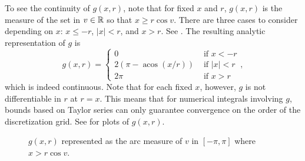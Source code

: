 \documentclass{amsart}
\DeclareMathOperator*{\acos}{acos}
\theoremstyle{plain}
\begin{document}
To see the continuity of $g(x,r)$, note that for fixed $x$ and $r$, $g(x,r)$ is the measure of the set in $v\in \mathbb R$ so that $x \ge r \cos v$.  
There are three cases to consider depending on $x$: $x \le -r$, $|x| < r$, and $x > r$. 
See .
The resulting analytic representation of $g$ is
\begin{equation}
  g(x,r) = \begin{cases}
    0 &\text{ if } x < -r\\
    2(\pi - \acos(x/r)) &\text{ if } |x| < r\\
    2\pi & \text{ if } x>r
  \end{cases},
  \label{g_form}
\end{equation}
which is indeed continuous.  Note that for each fixed $x$, however, $g$ is not differentiable in $r$ at $r=x$.  
This means that for numerical integrals involving $g$, bounds based on Taylor series can only guarantee convergence on the order of the discretization grid.  
See  for plots of $g(x,r)$.
\begin{figure}[h]
\begin{center}
%
%
\caption{ $g(x,r)$ represented as the arc measure of $v$ in $[-\pi,\pi]$ where $x > r\cos v$. }\label{g_cases}
\end{center}
\end{figure}
\end{document}
